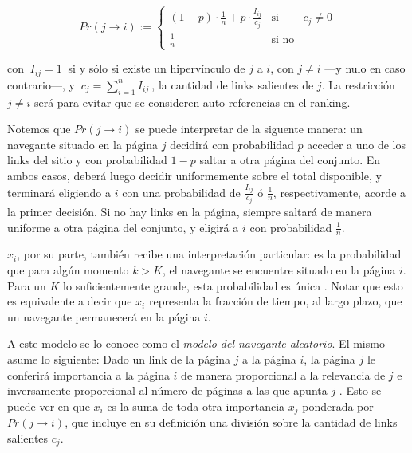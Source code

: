 \vspace{1em}
\begin{equation}
    Pr(j \longrightarrow i) := 
        \left\{ 
            \begin{array}{lcc}
            (1 - p)\cdot \frac{1}{n} + p\cdot \frac{I_{ij}}{c_j}    &  \text{si}    & c_j \neq 0\\
            \frac{1}{n}                                             &  \text{si no} &
            \end{array}
        \right.
\end{equation}

\vspace{1em}
\noindent con $\ I_{ij} = 1\ $ si y sólo si existe un hipervínculo de $j$ a $i$, con $j \neq i$ ---y nulo en caso contrario---, y $\ c_j = \sum_{i=1}^{n}{I_{ij}}\ $, la cantidad de links salientes de $j$. La restricción $j \neq i$ será para evitar que se consideren auto-referencias en el ranking.    

\vspace{1em}
Notemos que $Pr(j \longrightarrow i)$ se puede interpretar de la siguente manera: un navegante situado en la página $j$ decidirá con probabilidad $p$ acceder a uno de los links del sitio y con probabilidad $1 - p$ saltar a otra página del conjunto. En ambos casos, deberá luego decidir uniformemente sobre el total disponible, y terminará eligiendo a $i$ con una probabilidad de $\frac{I_{ij}}{c_j}$ ó $\frac{1}{n}$, respectivamente, acorde a la primer decisión. Si no hay links en la página, siempre saltará de manera uniforme a otra página del conjunto, y eligirá a $i$ con probabilidad $\frac{1}{n}$. 

\vspace{1em}
$x_i$, por su parte, también recibe una interpretación particular: es la probabilidad que para algún momento $k > K$, el navegante se encuentre situado en la página $i$. Para un $K$ lo suficientemente grande, esta probabilidad es única \cite{Kamvar03}. Notar que esto es equivalente a decir que  $x_i$ representa la fracción de tiempo, al largo plazo, que un navegante permanecerá en la página $i$.

\vspace{1em}
A este modelo se lo conoce como el \textit{modelo del navegante aleatorio}. El mismo asume lo siguiente: Dado un link de la página $j$ a la página $i$, la página $j$ le conferirá importancia a la página $i$ de manera proporcional a la relevancia de $j$ e inversamente proporcional al número de páginas a las que apunta $j$ \cite{Kamvar03}. Esto se puede ver en que $x_i$ es la suma de toda otra importancia $x_j$ ponderada por $Pr(j \longrightarrow i)$, que incluye en su definición una división sobre la cantidad de links salientes $c_j$. 



